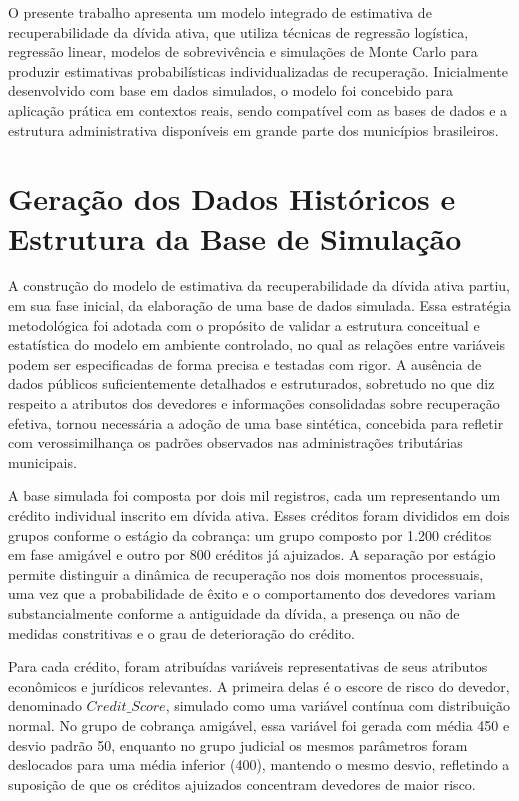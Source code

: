 \documentclass[a4paper,12pt]{article}
\begin{document}
O presente trabalho apresenta um modelo integrado de estimativa de recuperabilidade da dívida ativa, que utiliza técnicas de regressão logística, regressão linear, modelos de sobrevivência e simulações de Monte Carlo para produzir estimativas probabilísticas individualizadas de recuperação. Inicialmente desenvolvido com base em dados simulados, o modelo foi concebido para aplicação prática em contextos reais, sendo compatível com as bases de dados e a estrutura administrativa disponíveis em grande parte dos municípios brasileiros. 

\section{Geração dos Dados Históricos e Estrutura da Base de Simulação}

A construção do modelo de estimativa da recuperabilidade da dívida ativa partiu, em sua fase inicial, da elaboração de uma base de dados simulada. Essa estratégia metodológica foi adotada com o propósito de validar a estrutura conceitual e estatística do modelo em ambiente controlado, no qual as relações entre variáveis podem ser especificadas de forma precisa e testadas com rigor. A ausência de dados públicos suficientemente detalhados e estruturados, sobretudo no que diz respeito a atributos dos devedores e informações consolidadas sobre recuperação efetiva, tornou necessária a adoção de uma base sintética, concebida para refletir com verossimilhança os padrões observados nas administrações tributárias municipais.

A base simulada foi composta por dois mil registros, cada um representando um crédito individual inscrito em dívida ativa. Esses créditos foram divididos em dois grupos conforme o estágio da cobrança: um grupo composto por 1.200 créditos em fase amigável e outro por 800 créditos já ajuizados. A separação por estágio permite distinguir a dinâmica de recuperação nos dois momentos processuais, uma vez que a probabilidade de êxito e o comportamento dos devedores variam substancialmente conforme a antiguidade da dívida, a presença ou não de medidas constritivas e o grau de deterioração do crédito.

Para cada crédito, foram atribuídas variáveis representativas de seus atributos econômicos e jurídicos relevantes. A primeira delas é o escore de risco do devedor, denominado $Credit\_Score$, simulado como uma variável contínua com distribuição normal. No grupo de cobrança amigável, essa variável foi gerada com média 450 e desvio padrão 50, enquanto no grupo judicial os mesmos parâmetros foram deslocados para uma média inferior (400), mantendo o mesmo desvio, refletindo a suposição de que os créditos ajuizados concentram devedores de maior risco.
\end{document}
